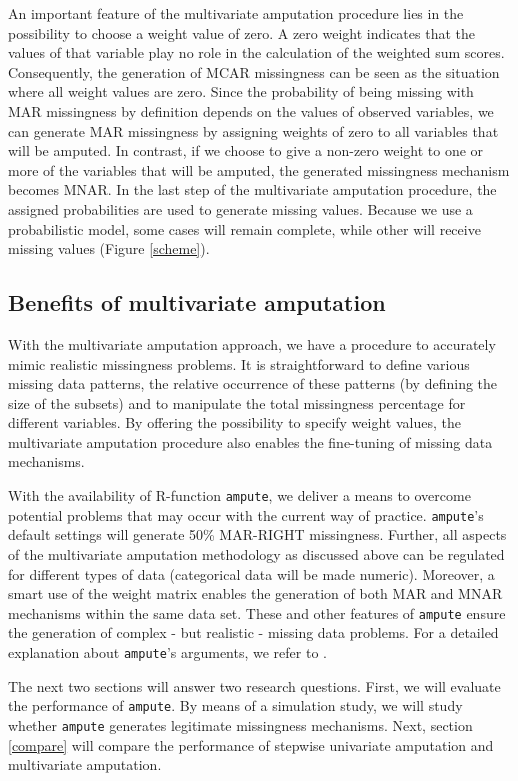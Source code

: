 \documentclass[11pt,a4paper]{article}
\newcommand{\code}[1]{\texttt{#1}}
\begin{document}
An important feature of the multivariate amputation procedure lies in the possibility to choose a weight value of zero. A zero weight indicates that the values of that variable play no role in the calculation of the weighted sum scores. Consequently, the generation of MCAR missingness can be seen as the situation where all weight values are zero. Since the probability of being missing with MAR missingness by definition depends on the values of observed variables, we can generate MAR missingness by assigning weights of zero to all variables that will be amputed. In contrast, if we choose to give a non-zero weight to one or more of the variables that will be amputed, the generated missingness mechanism becomes MNAR. In the last step of the multivariate amputation procedure, the assigned probabilities are used to generate missing values. Because we use a probabilistic model, some cases will remain complete, while other will receive missing values (Figure \ref{scheme}).

\subsection{\normalsize Benefits of multivariate amputation}\label{solution}

With the multivariate amputation approach, we have a procedure to accurately mimic realistic missingness problems. It is straightforward to define various missing data patterns, the relative occurrence of these patterns (by defining the size of the subsets) and to manipulate the total missingness percentage for different variables. By offering the possibility to specify weight values, the multivariate amputation procedure also enables the fine-tuning of missing data mechanisms. 

With the availability of R-function \code{ampute}, we deliver a means to overcome potential problems that may occur with the current way of practice. \code{ampute}'s default settings will generate 50\% MAR-RIGHT missingness. Further, all aspects of the multivariate amputation methodology as discussed above can be regulated for different types of data (categorical data will be made numeric). Moreover, a smart use of the weight matrix enables the generation of both MAR and MNAR mechanisms within the same data set. These and other features of \code{ampute} ensure the generation of complex - but realistic - missing data problems. For a detailed explanation about \code{ampute}'s arguments, we refer to \citet{AmputeVignette}.

The next two sections will answer two research questions. First, we will evaluate the performance of \code{ampute}. By means of a simulation study, we will study whether \code{ampute} generates legitimate missingness mechanisms. Next, section \ref{compare} will compare the performance of stepwise univariate amputation and multivariate amputation. 
\end{document}
